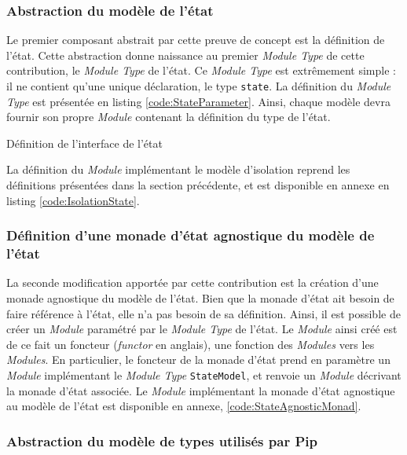 			\subsubsection{Abstraction du modèle de l'état}

			Le premier composant abstrait par cette preuve de concept est la définition de l'état. Cette abstraction donne naissance au premier \emph{Module Type} de cette contribution, le \emph{Module Type} de l'état. Ce \emph{Module Type} est extrêmement simple : il ne contient qu'une unique déclaration, le type \texttt{state}. La définition du \emph{Module Type} est présentée en listing \ref{code:StateParameter}. Ainsi, chaque modèle devra fournir son propre \emph{Module} contenant la définition du type de l'état.
			\begin{listing}[!ht]
				\caption{Définition de l'interface de l'état}
				\label{code:StateParameter}
			\end{listing}

			La définition du \emph{Module} implémentant le modèle d'isolation reprend les définitions présentées dans la section précédente, et est disponible en annexe en listing \ref{code:IsolationState}.

			\subsubsection{Définition d'une monade d'état agnostique du modèle de l'état}

			La seconde modification apportée par cette contribution est la création d'une monade agnostique du modèle de l'état. Bien que la monade d'état ait besoin de faire référence à l'état, elle n'a pas besoin de sa définition. Ainsi, il est possible de créer un \emph{Module} paramétré par le \emph{Module Type} de l'état. Le \emph{Module} ainsi créé est de ce fait un foncteur (\emph{functor} en anglais), une fonction des \emph{Modules} vers les \emph{Modules}. En particulier, le foncteur de la monade d'état prend en paramètre un \emph{Module} implémentant le \emph{Module Type} \texttt{StateModel}, et renvoie un \emph{Module} décrivant la monade d'état associée. Le \emph{Module} implémentant la monade d'état agnostique au modèle de l'état est disponible en annexe, \ref{code:StateAgnosticMonad}.

			\subsubsection{Abstraction du modèle de types utilisés par Pip}


